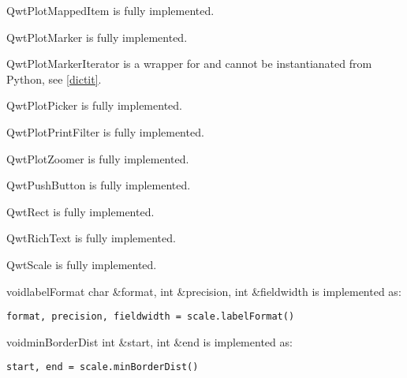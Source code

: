 \documentclass{manual}
\begin{document}
\begin{classdesc*}{QwtPlotMappedItem}
  is fully implemented.
\end{classdesc*}

\begin{classdesc*}{QwtPlotMarker}
  is fully implemented.
\end{classdesc*}

\begin{classdesc*}{QwtPlotMarkerIterator}
  is a wrapper for  and cannot be instantianated
  from Python, see \ref{dictit}.
\end{classdesc*}

\begin{classdesc*}{QwtPlotPicker}
  is fully implemented.
\end{classdesc*}

\begin{classdesc*}{QwtPlotPrintFilter}
  is fully implemented.
\end{classdesc*}

\begin{classdesc*}{QwtPlotZoomer}
  is fully implemented.
\end{classdesc*}

\begin{classdesc*}{QwtPushButton}
  is fully implemented.
\end{classdesc*}

\begin{classdesc*}{QwtRect}
  is fully implemented.
\end{classdesc*}

\begin{classdesc*}{QwtRichText}
  is fully implemented.
\end{classdesc*}

\begin{classdesc*}{QwtScale}
  is fully implemented.

  \begin{cfuncdesc}{void}{labelFormat}{
      char \&format, int \&precision, int \&fieldwidth}
    is implemented as:
    \begin{verbatim}
format, precision, fieldwidth = scale.labelFormat()
    \end{verbatim}    
  \end{cfuncdesc}

  \begin{cfuncdesc}{void}{minBorderDist}{
      int \&start, int \&end}
    is implemented as:
    \begin{verbatim}
start, end = scale.minBorderDist()
    \end{verbatim}    
  \end{cfuncdesc}

\end{classdesc*}
\end{document}
